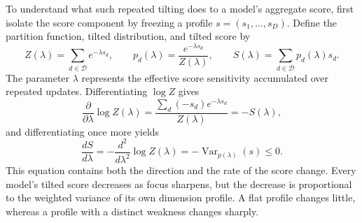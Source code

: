 To understand what such repeated tilting does to a model's aggregate score, first isolate the score component by freezing a profile $s=(s_1,\dots,s_D)$. Define the partition function, tilted distribution, and tilted score by
\begin{equation}
    Z(\lambda)=\sum_{d\in\mathcal{D}}e^{-\lambda s_d},
    \qquad
    p_d(\lambda)=\frac{e^{-\lambda s_d}}{Z(\lambda)},
    \qquad
    S(\lambda)=\sum_{d\in\mathcal{D}}p_d(\lambda)s_d .
    \label{eq:tilted_score_appendix}
\end{equation}
The parameter $\lambda$ represents the effective score sensitivity accumulated over repeated updates. Differentiating $\log Z$ gives
\begin{equation}
    \frac{\partial}{\partial\lambda}\log Z(\lambda)
    =
    \frac{\sum_d(-s_d)e^{-\lambda s_d}}{Z(\lambda)}
    =
    -S(\lambda),
\end{equation}
and differentiating once more yields
\begin{equation}
    \frac{dS}{d\lambda}
    =
    -\frac{d^2}{d\lambda^2}\log Z(\lambda)
    =
    -\operatorname{Var}_{p(\lambda)}(s)
    \le 0.
    \label{eq:tilt_derivative_appendix}
\end{equation}
This equation contains both the direction and the rate of the score change. Every model's tilted score decreases as focus sharpens, but the decrease is proportional to the weighted variance of its own dimension profile. A flat profile changes little, whereas a profile with a distinct weakness changes sharply.

